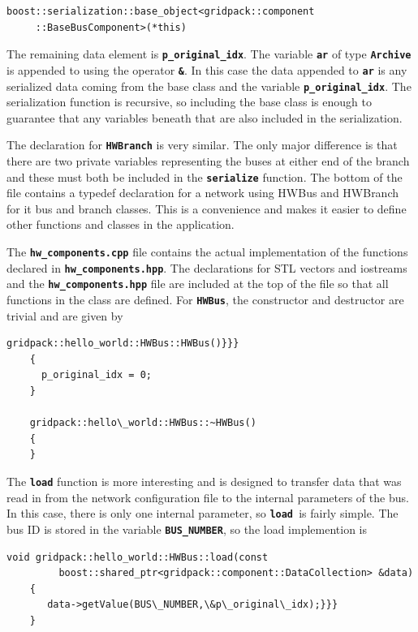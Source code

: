 \documentclass[12pt]{report} %
\begin{document}
{
\color{red}
\begin{Verbatim}[fontseries=b]
boost::serialization::base_object<gridpack::component
     ::BaseBusComponent>(*this)
\end{Verbatim}
}

The remaining data element is \texttt{\textbf{p\_original\_idx}}. The variable \texttt{\textbf{ar}} of type \texttt{\textbf{Archive}} is appended to using the operator \texttt{\textbf{\&}}. In this case the data appended to \texttt{\textbf{ar}} is any serialized data coming from the base class and the variable \texttt{\textbf{p\_original\_idx}}. The serialization function is recursive, so including the base class is enough to guarantee that any variables beneath that are also included in the serialization.

The declaration for \texttt{\textbf{HWBranch}} is very similar. The only major difference is that there are two private variables representing the buses at either end of the branch and these must both be included in the \texttt{\textbf{serialize}} function.
The bottom of the file contains a typedef declaration for a network using HWBus and HWBranch for it bus and branch classes. This is a convenience and makes it easier to define other functions and classes in the application.

The \texttt{\textbf{hw\_components.cpp}} file contains the actual implementation of the functions declared in \texttt{\textbf{hw\_components.hpp}}. The declarations for STL vectors and iostreams and the \texttt{\textbf{hw\_components.hpp}} file are included at the top of the file so that all functions in the class are defined. For \texttt{\textbf{HWBus}}, the constructor and destructor are trivial and are given by

{
\color{red}
\begin{Verbatim}[fontseries=b]
    gridpack::hello_world::HWBus::HWBus()}}}
    {
      p_original_idx = 0;
    }

    gridpack::hello\_world::HWBus::~HWBus()
    {
    }
\end{Verbatim}
}

The \texttt{\textbf{load}} function is more interesting and is designed to transfer data that was read in from the network configuration file to the internal parameters of the bus. In this case, there is only one internal parameter, so \texttt{\textbf{load }}is fairly simple. The bus ID is stored in the variable \texttt{\textbf{BUS\_NUMBER}}, so the load implemention is

{
\color{red}
\begin{Verbatim}[fontseries=b]
    void gridpack::hello_world::HWBus::load(const
         boost::shared_ptr<gridpack::component::DataCollection> &data)
    {
       data->getValue(BUS\_NUMBER,\&p\_original\_idx);}}}
    }
\end{Verbatim}
}
\end{document}

